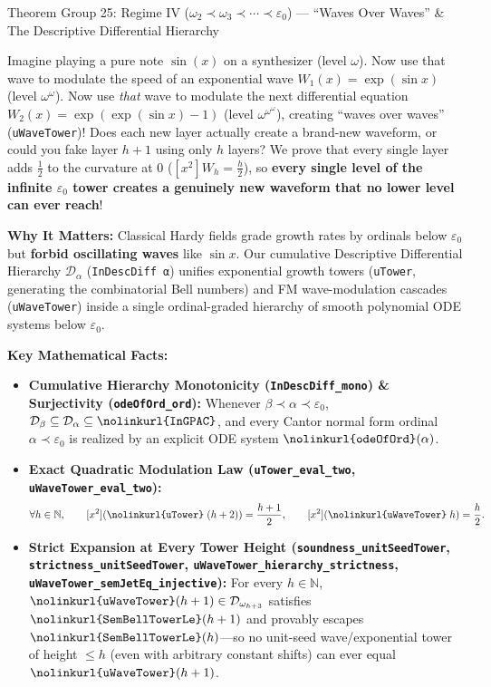 \documentclass[11pt,a4paper]{article}
\newcommand{\N}{\ensuremath{\mathbb{N}}}
\newcommand{\lean}[1]{\texttt{\nolinkurl{#1}}}
\begin{document}
\begin{thmcard}{Theorem Group 25: Regime IV (\texorpdfstring{$\omega_2 \prec \omega_3 \prec \cdots \prec \varepsilon_0$}{omega\_2 < omega\_3 < ... < epsilon\_0}) --- ``Waves Over Waves'' \& The Descriptive Differential Hierarchy}
\begin{eli5box}
Imagine playing a pure note $\sin(x)$ on a synthesizer (level $\omega$). Now use that wave to modulate the speed of an exponential wave $W_1(x) = \exp(\sin x)$ (level $\omega^\omega$). Now use \emph{that} wave to modulate the next differential equation $W_2(x) = \exp(\exp(\sin x)-1)$ (level $\omega^{\omega^\omega}$), creating ``waves over waves'' (\lean{uWaveTower})! Does each new layer actually create a brand-new waveform, or could you fake layer $h+1$ using only $h$ layers? We prove that every single layer adds $\frac{1}{2}$ to the curvature at $0$ ($[x^2]W_h = \frac{h}{2}$), so \textbf{every single level of the infinite $\varepsilon_0$ tower creates a genuinely new waveform that no lower level can ever reach}!
\end{eli5box}

\textbf{Why It Matters:}
Classical Hardy fields grade growth rates by ordinals below $\varepsilon_0$ but \textbf{forbid oscillating waves} like $\sin x$. Our cumulative Descriptive Differential Hierarchy $\mathcal{D}_\alpha$ (\lean{InDescDiff α}) unifies exponential growth towers (\lean{uTower}, generating the combinatorial Bell numbers) and FM wave-modulation cascades (\lean{uWaveTower}) inside a single ordinal-graded hierarchy of smooth polynomial ODE systems below $\varepsilon_0$.

\textbf{Key Mathematical Facts:}
\begin{itemize}
  \item \textbf{Cumulative Hierarchy Monotonicity (\lean{InDescDiff_mono}) \& Surjectivity (\lean{odeOfOrd_ord}):} Whenever $\beta \prec \alpha \prec \varepsilon_0$, $\mathcal{D}_\beta \subseteq \mathcal{D}_\alpha \subseteq \lean{InGPAC}$, and every Cantor normal form ordinal $\alpha \prec \varepsilon_0$ is realized by an explicit ODE system $\lean{odeOfOrd}(\alpha)$.
  \item \textbf{Exact Quadratic Modulation Law (\lean{uTower_eval_two}, \lean{uWaveTower_eval_two}):}
  \[
    \forall h \in \N,\qquad [x^2](\lean{uTower}\;(h+2)) = \frac{h+1}{2}, \qquad [x^2](\lean{uWaveTower}\;h) = \frac{h}{2}.
  \]
  \item \textbf{Strict Expansion at Every Tower Height (\lean{soundness_unitSeedTower}, \lean{strictness_unitSeedTower}, \lean{uWaveTower_hierarchy_strictness}, \lean{uWaveTower_semJetEq_injective}):} For every $h \in \N$, $\lean{uWaveTower}(h+1) \in \mathcal{D}_{\omega_{h+3}}$ satisfies $\lean{SemBellTowerLe}(h+1)$ and provably escapes $\lean{SemBellTowerLe}(h)$---so no unit-seed wave/exponential tower of height $\le h$ (even with arbitrary constant shifts) can ever equal $\lean{uWaveTower}(h+1)$.
\end{itemize}


\end{thmcard}
\end{document}
